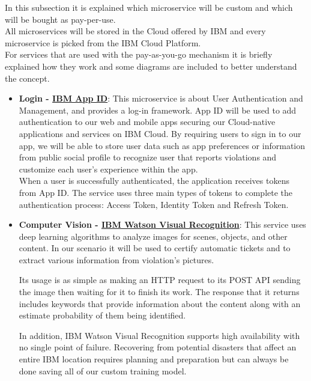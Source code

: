 In this subsection it is explained which microservice will be custom and which will be bought as pay-per-use. 
\\All microservices will be stored in the Cloud offered by IBM and every microservice is picked from the IBM Cloud Platform.
\\For services that are used with the pay-as-you-go mechanism it is briefly explained how they work and some diagrams are included to better understand the concept.
\begin{itemize}
	\item \textbf{Login - \href{https://cloud.ibm.com/catalog/services/app-id}{IBM App ID}}: \hypertarget{appid}{} This microservice is about User Authentication and Management, and provides a log-in framework. App ID will be used to add authentication to our web and mobile apps securing our Cloud-native applications and services on IBM Cloud. By requiring users to sign in to our app, we will be able to store user data such as app preferences or information from public social profile to recognize user that reports violations and customize each user's experience within the app.
	\\When a user is successfully authenticated, the application receives tokens from App ID. The service uses three main types of tokens to complete the authentication process: Access Token, Identity Token and Refresh Token.

	\item \textbf{Computer Vision - \href{https://cloud.ibm.com/catalog/services/visual-recognition}{IBM Watson Visual Recognition}}: \hypertarget{watson}{} This service uses deep learning algorithms to analyze images for scenes, objects, and other content. In our scenario it will be used to certify automatic tickets and to extract various information from violation's pictures.
	
	Its usage is as simple as making an HTTP request to its POST API sending the image then waiting for it to finish its work. The response that it returns includes keywords that provide information about the content along with an estimate probability of them being identified.
	
	In addition, IBM Watson Visual Recognition supports high availability with no single point of failure. Recovering from potential disasters that affect an entire IBM location requires planning and preparation but can always be done saving all of our custom training model.
	

\end{itemize}

